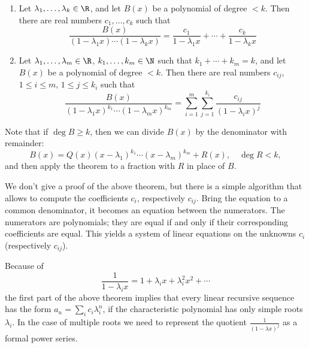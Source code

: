 \begin{page}
\setcounter{section}{2}
\setcounter{subsection}{3}
\setcounter{dfn}{11}
\label{portion:758}

\begin{thm}
\begin{enumerate}
\item
Let $\lambda_1, \ldots, \lambda_k \in \R$, and let $B(x)$ be a polynomial of degree $< k$.
Then there are real numbers $c_1, \ldots, c_k$ such that
\[
\frac{B(x)}{(1-\lambda_1 x) \cdots (1-\lambda_k x)} = \frac{c_1}{1-\lambda_1 x} + \cdots + \frac{c_k}{1-\lambda_k x}
\]
\item
Let $\lambda_1, \ldots, \lambda_m \in \R$, $k_1, \ldots, k_m \in \N$ such that $k_1 + \cdots + k_m = k$,
and let $B(x)$ be a polynomial of degree $< k$.
Then there are real numbers $c_{ij}$, $1 \le i \le m$, $1 \le j \le k_i$ such that
\[
\frac{B(x)}{(1-\lambda_1 x)^{k_1} \cdots (1-\lambda_m x)^{k_m}} = \sum_{i=1}^m \sum_{j=1}^{k_i} \frac{c_{ij}}{(1-\lambda_i x)^j}
\]
\end{enumerate}
\end{thm}

\end{page}

\begin{page}
\setcounter{section}{2}
\setcounter{subsection}{3}
\setcounter{dfn}{12}
\label{portion:761}

\begin{rem}
Note that if $\deg B \ge k$, then we can divide $B(x)$ by the denominator with remainder:
\[
B(x) = Q(x) (x-\lambda_1)^{k_1} \cdots (x-\lambda_m)^{k_m} + R(x), \quad \deg R < k,
\]
and then apply the theorem to a fraction with $R$ in place of $B$.
\end{rem}

\end{page}

\begin{page}
\setcounter{section}{2}
\setcounter{subsection}{4}
\setcounter{dfn}{12}
\label{portion:762}


We don't give a proof of the above theorem, but there is a simple algorithm that allows to compute the coefficients $c_i$, respectively $c_{ij}$.
Bring the equation to a common denominator, it becomes an equation between the numerators.
The numerators are polynomials; they are equal if and only if their corresponding coefficients are equal.
This yields a system of linear equations on the unknowns $c_i$ (respectively $c_{ij}$).

Because of
\[
\frac{1}{1-\lambda_i x} = 1 + \lambda_i x + \lambda_i^2 x^2 + \cdots
\]
the first part of the above theorem implies that every linear recursive sequence has the form $a_n = \sum_i c_i \lambda_i^n$,
if the characteristic polynomial has only simple roots $\lambda_i$.
In the case of multiple roots we need to represent the quotient $\frac{1}{(1-\lambda x)^j}$ as a formal power series.



\end{page}


